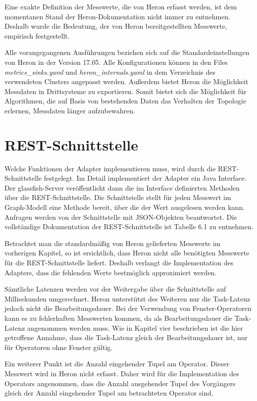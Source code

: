 Eine exakte Definition der Messwerte, die von Heron erfasst werden, ist dem momentanen Stand der Heron-Dokumentation nicht immer zu entnehmen. 
Deshalb wurde die Bedeutung, der von Heron bereitgestellten Messwerte, empirisch festgestellt.

Alle vorangegangenen Ausführungen beziehen sich auf die Standardeinstellungen von Heron in der Version 17.05.
Alle Konfigurationen können in den Files \textit{metrics\_sinks.yaml} und \textit{heron\_internals.yaml} in dem Verzeichnis des verwendeten Clusters angepasst werden. 
Außerdem bietet Heron die Möglichkeit Messdaten in Drittsysteme zu exportieren.
Somit bietet sich die Möglichkeit für Algorithmen, die auf Basis von bestehenden Daten das Verhalten der Topologie erlernen, Messdaten länger aufzubewahren.

\section{REST-Schnittstelle}

Welche Funktionen der Adapter implementieren muss, wird durch die REST-Schnittstelle festgelegt.
Im Detail implementiert der Adapter ein Java Interface.
Der glassfish-Server veröffentlicht dann die im Interface definierten Methoden über die REST-Schnittstelle.
Die Schnittstelle stellt für jeden Messwert im Graph-Modell eine Methode bereit, über die der Wert ausgelesen werden kann.
Anfragen werden von der Schnittstelle mit JSON-Objekten beantwortet.
Die vollständige Dokumentation der REST-Schnittstelle ist Tabelle 6.1 zu entnehmen.


Betrachtet man die standardmäßig von Heron gelieferten Messwerte im vorherigen Kapitel, so ist ersichtlich, dass Heron nicht alle benötigten Messwerte für die REST-Schnittstelle liefert.
Deshalb verlangt die Implementation des Adapters, dass die fehlenden Werte bestmöglich approximiert werden.

Sämtliche Latenzen werden vor der Weitergabe über die Schnittstelle auf Millisekunden umgerechnet.
Heron unterstützt des Weiteren nur die Task-Latenz jedoch nicht die Bearbeitungsdauer.
Bei der Verwendung von Fenster-Operatoren kann es zu fehlerhaften Messwerten kommen, da als Bearbeitungsdauer die Task-Latenz angenommen werden muss.
Wie in Kapitel vier beschrieben ist die hier getroffene Annahme, dass die Task-Latenz gleich der Bearbeitungsdauer ist, nur für Operatoren ohne Fenster gültig.

Ein weiterer Punkt ist die Anzahl eingehender Tupel am Operator.
Dieser Messwert wird in Heron nicht erfasst.
Daher wird für die Implementation des Operators angenommen, dass die Anzahl ausgehender Tupel des Vorgängers gleich der Anzahl eingehender Tupel am betrachteten Operator sind.

